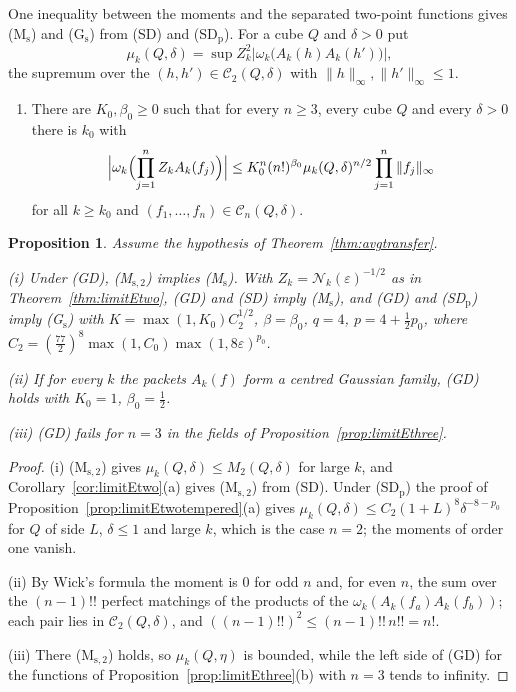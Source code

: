 \documentclass[aps,prd,twocolumn,superscriptaddress,nofootinbib,longbibliography,floatfix,amsmath,amssymb,10pt]{revtex4-2}
\newtheorem{proposition}[theorem]{Proposition}
\theoremstyle{definition}
\theoremstyle{remark}
\begin{document}
One inequality between the moments and the separated two-point functions
gives (M$_{\mathrm s}$) and (G$_{\mathrm s}$) from (SD) and
(SD$_{\mathrm p}$). For a cube $Q$ and $\delta>0$ put
\[
\mu_k(Q,\delta)=\sup Z_k^2\bigl|\omega_k\bigl(A_k(h)A_k(h')\bigr)\bigr| ,
\]
the supremum over the $(h,h')\in\mathcal C_2(Q,\delta)$ with
$\|h\|_\infty,\|h'\|_\infty\le1$.
\begin{enumerate}[label=\textup{(GD)},leftmargin=*]
\item There are $K_0,\beta_0\ge0$ such that for every $n\ge3$, every cube $Q$
and every $\delta>0$ there is $k_0$ with
\[
\Bigl|\omega_k\Bigl(\prod_{j=1}^nZ_kA_k(f_j)\Bigr)\Bigr|\le K_0^n(n!)^{
\beta_0}\mu_k(Q,\delta)^{n/2}\prod_{j=1}^n\|f_j\|_\infty
\]
for all $k\ge k_0$ and $(f_1,\dots,f_n)\in\mathcal C_n(Q,\delta)$.
\end{enumerate}

\begin{proposition}\label{prop:limitEdomination}
Assume the hypothesis of Theorem~\textup{\ref{thm:avgtransfer}}.

\textup{(i)} Under \textup{(GD)}, \textup{(M$_{\mathrm s,2}$)} implies
\textup{(M$_{\mathrm s}$)}. With $Z_k=\mathcal N_k(\varepsilon)^{-1/2}$ as in
Theorem~\textup{\ref{thm:limitEtwo}}, \textup{(GD)} and \textup{(SD)} imply
\textup{(M$_{\mathrm s}$)}, and \textup{(GD)} and \textup{(SD$_{\mathrm p}$)}
imply \textup{(G$_{\mathrm s}$)} with $K=\max(1,K_0)C_2^{1/2}$, $\beta=\beta_0$,
$q=4$, $p=4+\frac12p_0$, where $C_2=(\frac{77}2)^8\max(1,C_0)\max(1,
8\varepsilon)^{p_0}$.

\textup{(ii)} If for every $k$ the packets $A_k(f)$ form a centred Gaussian
family, \textup{(GD)} holds with $K_0=1$, $\beta_0=\frac12$.

\textup{(iii)} \textup{(GD)} fails for $n=3$ in the fields of
Proposition~\textup{\ref{prop:limitEthree}}.
\end{proposition}

\begin{proof}
(i) (M$_{\mathrm s,2}$) gives $\mu_k(Q,\delta)\le M_2(Q,\delta)$ for large
$k$, and Corollary~\ref{cor:limitEtwo}(a) gives (M$_{\mathrm s,2}$) from
(SD). Under (SD$_{\mathrm p}$) the proof of
Proposition~\ref{prop:limitEtwotempered}(a) gives $\mu_k(Q,\delta)\le
C_2(1+L)^8\delta^{-8-p_0}$ for $Q$ of side $L$, $\delta\le1$ and large $k$,
which is the case $n=2$; the moments of order one vanish.

(ii) By Wick's formula the moment is $0$ for odd $n$ and, for even $n$, the
sum over the $(n-1)!!$ perfect matchings of the products of the
$\omega_k(A_k(f_a)A_k(f_b))$; each pair lies in $\mathcal C_2(Q,\delta)$, and
$((n-1)!!)^2\le(n-1)!!\,n!!=n!$.

(iii) There (M$_{\mathrm s,2}$) holds, so $\mu_k(Q,\eta)$ is bounded, while
the left side of (GD) for the functions of
Proposition~\ref{prop:limitEthree}(b) with $n=3$ tends to infinity.
\end{proof}
\end{document}
